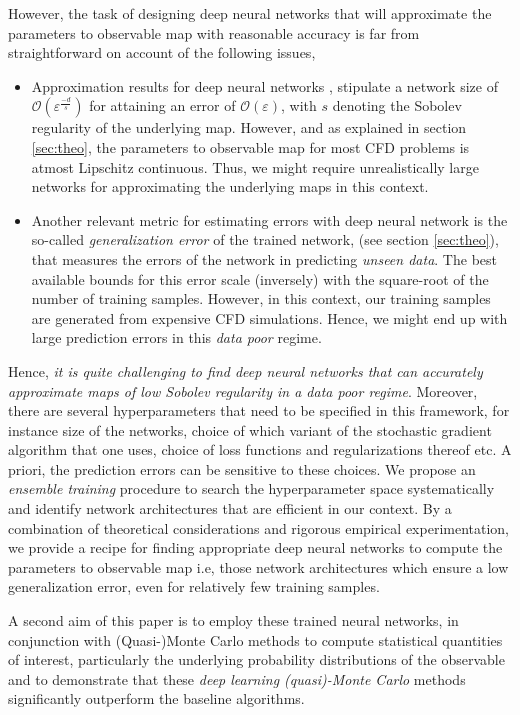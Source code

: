 \documentclass[a4paper]{article}
\numberwithin{equation}{section}
\numberwithin{equation}{section}
\theoremstyle{definition}
\theoremstyle{myremarkstyle}
\renewcommand{\epsilon}{\varepsilon}
\begin{document}
However, the task of designing deep neural networks that will approximate the parameters to observable map with reasonable accuracy is far from straightforward on account of the following issues,
\begin{itemize}
\item Approximation results for deep neural networks \cite{YAR1,Pet1,Pet2}, stipulate a network size of ${\mathcal O}\left(\epsilon^{\frac{-d}{s}}\right)$ for attaining an error of ${\mathcal O}(\epsilon)$, with $s$ denoting the Sobolev regularity of the underlying map. However, and as explained in section \ref{sec:theo}, the parameters to observable map for most CFD problems is atmost Lipschitz continuous. Thus, we might require unrealistically large networks for approximating the underlying maps in this context. 
\item Another relevant metric for estimating errors with deep neural network is the so-called \emph{generalization error} of the trained network, (see section \ref{sec:theo}), that measures the errors of the network in predicting \emph{unseen data}. The best available bounds for this error scale (inversely) with the square-root of the number of training samples. However, in this context, our training samples are generated from expensive CFD simulations. Hence, we might end up with large prediction errors in this \emph{data poor} regime. 
\end{itemize}
Hence, \emph{it is quite challenging to find deep neural networks that can accurately approximate maps of low Sobolev regularity in a data poor regime}. Moreover, there are several hyperparameters that need to be specified in this framework, for instance size of the networks, choice of which variant of the stochastic gradient algorithm that one uses, choice of loss functions and regularizations thereof etc. A priori, the prediction errors can be sensitive to these choices.  We propose an \emph{ensemble training} procedure to search the hyperparameter space systematically and identify network architectures that are efficient in our context. By a combination of theoretical considerations and rigorous empirical experimentation, we provide a recipe for finding appropriate deep neural networks to compute the parameters to observable map i.e, those network architectures which ensure a low generalization error, even for relatively few training samples. 

A second aim of this paper is to employ these trained neural networks, in conjunction with (Quasi-)Monte Carlo methods to compute statistical quantities of interest, particularly the underlying probability distributions of the observable and to demonstrate that these \emph{deep learning (quasi)-Monte Carlo} methods significantly outperform the baseline algorithms. 
\end{document}
